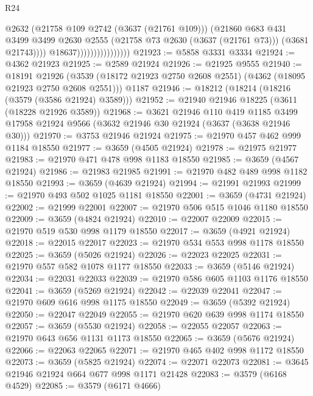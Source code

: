 \begin{lexlean}{R24}
\begin{coremodule}
                                        @2632
                                        (@21758 @109 @2742 (@3637 (@21761 @109)))
                                        (@21860
                                          @683
                                          @431
                                          @3499
                                          @3499
                                          @2630
                                          @2555
                                          (@21758 @73 @2630 (@3637 (@21761 @73)))
                                          (@3681 @21743))))
                                    @18637))))))))))))))))
@21923 := @5858 @3331 @3334
@21924 := @4362 @21923
@21925 := @2589 @21924
@21926 := @21925 @9555
@21940 := @18191
    @21926
    (@3539 (@18172 @21923 @2750 @2608 @2551) (@4362 (@18095 @21923 @2750 @2608 @2551)))
    @1187
@21946 := @18212 (@18214 (@18216 (@3579 (@3586 @21924) @3589)))
@21952 := @21940 @21946 @18225 (@3611 (@18228 @21926 @3589))
@21968 := @3621
    @21946
    @110
    @419
    @1185
    @3499
    @17958
    @21924
    @9566
    (@3632 @21946 @30 @21924 (@3637 (@3638 @21946 @30)))
@21970 := @3753 @21946 @21924
@21975 := @21970 @457 @462 @999 @1184 @18550
@21977 := @3659 (@4505 @21924)
@21978 := @21975 @21977
@21983 := @21970 @471 @478 @998 @1183 @18550
@21985 := @3659 (@4567 @21924)
@21986 := @21983 @21985
@21991 := @21970 @482 @489 @998 @1182 @18550
@21993 := @3659 (@4639 @21924)
@21994 := @21991 @21993
@21999 := @21970 @493 @502 @1025 @1181 @18550
@22001 := @3659 (@4731 @21924)
@22002 := @21999 @22001
@22007 := @21970 @506 @515 @1046 @1180 @18550
@22009 := @3659 (@4824 @21924)
@22010 := @22007 @22009
@22015 := @21970 @519 @530 @998 @1179 @18550
@22017 := @3659 (@4921 @21924)
@22018 := @22015 @22017
@22023 := @21970 @534 @553 @998 @1178 @18550
@22025 := @3659 (@5026 @21924)
@22026 := @22023 @22025
@22031 := @21970 @557 @582 @1078 @1177 @18550
@22033 := @3659 (@5146 @21924)
@22034 := @22031 @22033
@22039 := @21970 @586 @605 @1103 @1176 @18550
@22041 := @3659 (@5269 @21924)
@22042 := @22039 @22041
@22047 := @21970 @609 @616 @998 @1175 @18550
@22049 := @3659 (@5392 @21924)
@22050 := @22047 @22049
@22055 := @21970 @620 @639 @998 @1174 @18550
@22057 := @3659 (@5530 @21924)
@22058 := @22055 @22057
@22063 := @21970 @643 @656 @1131 @1173 @18550
@22065 := @3659 (@5676 @21924)
@22066 := @22063 @22065
@22071 := @21970 @465 @402 @998 @1172 @18550
@22073 := @3659 (@5825 @21924)
@22074 := @22071 @22073
@22081 := @3645 @21946 @21924 @664 @677 @998 @1171 @21428
@22083 := @3579 (@6168 @4529)
@22085 := @3579 (@6171 @4666)

\end{coremodule}
\end{lexlean}
